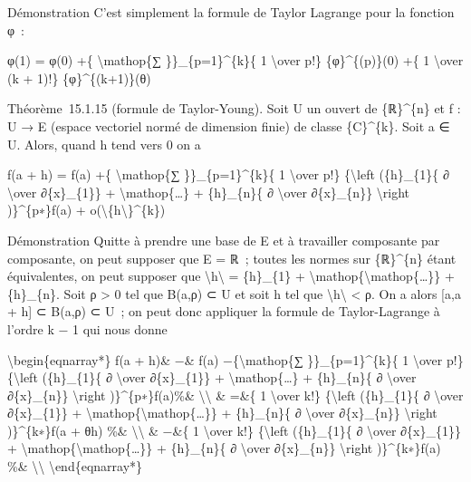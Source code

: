 Démonstration C'est simplement la formule de Taylor Lagrange pour la
fonction φ~:

φ(1) = φ(0) +\{ \textbackslash{}mathop\{∑ \}\}\_\{p=1\}\^{}\{k\}\{ 1
\textbackslash{}over p!\} \{φ\}\^{}\{(p)\}(0) +\{ 1 \textbackslash{}over
(k + 1)!\} \{φ\}\^{}\{(k+1)\}(θ)

Théorème~15.1.15 (formule de Taylor-Young). Soit U un ouvert de
\{ℝ\}\^{}\{n\} et f : U → E (espace vectoriel normé de dimension finie)
de classe \{C\}\^{}\{k\}. Soit a ∈ U. Alors, quand h tend vers 0 on a

f(a + h) = f(a) +\{ \textbackslash{}mathop\{∑ \}\}\_\{p=1\}\^{}\{k\}\{ 1
\textbackslash{}over p!\} \{\textbackslash{}left (\{h\}\_\{1\}\{ ∂
\textbackslash{}over ∂\{x\}\_\{1\}\} +
\textbackslash{}mathop\{\ldots{}\} + \{h\}\_\{n\}\{ ∂
\textbackslash{}over ∂\{x\}\_\{n\}\} \textbackslash{}right
)\}\^{}\{p∗\}f(a) +
o(\textbackslash{}\textbar{}\{h\textbackslash{}\textbar{}\}\^{}\{k\})

Démonstration Quitte à prendre une base de E et à travailler composante
par composante, on peut supposer que E = ℝ~; toutes les normes sur
\{ℝ\}\^{}\{n\} étant équivalentes, on peut supposer que
\textbackslash{}\textbar{}h\textbackslash{}\textbar{} =
\textbar{}\{h\}\_\{1\}\textbar{} +
\textbackslash{}mathop\{\textbackslash{}mathop\{\ldots{}\}\} +
\textbar{}\{h\}\_\{n\}\textbar{}. Soit ρ \textgreater{} 0 tel que B(a,ρ)
⊂ U et soit h tel que
\textbackslash{}\textbar{}h\textbackslash{}\textbar{} \textless{} ρ. On
a alors {[}a,a + h{]} ⊂ B(a,ρ) ⊂ U~; on peut donc appliquer la formule
de Taylor-Lagrange à l'ordre k − 1 qui nous donne

\textbackslash{}begin\{eqnarray*\} f(a + h)\& −\& f(a)
−\{\textbackslash{}mathop\{∑ \}\}\_\{p=1\}\^{}\{k\}\{ 1
\textbackslash{}over p!\} \{\textbackslash{}left (\{h\}\_\{1\}\{ ∂
\textbackslash{}over ∂\{x\}\_\{1\}\} +
\textbackslash{}mathop\{\ldots{}\} + \{h\}\_\{n\}\{ ∂
\textbackslash{}over ∂\{x\}\_\{n\}\} \textbackslash{}right
)\}\^{}\{p∗\}f(a)\%\& \textbackslash{}\textbackslash{} \& =\&\{ 1
\textbackslash{}over k!\} \{\textbackslash{}left (\{h\}\_\{1\}\{ ∂
\textbackslash{}over ∂\{x\}\_\{1\}\} +
\textbackslash{}mathop\{\textbackslash{}mathop\{\ldots{}\}\} +
\{h\}\_\{n\}\{ ∂ \textbackslash{}over ∂\{x\}\_\{n\}\}
\textbackslash{}right )\}\^{}\{k∗\}f(a + θh) \%\&
\textbackslash{}\textbackslash{} \& −\&\{ 1 \textbackslash{}over k!\}
\{\textbackslash{}left (\{h\}\_\{1\}\{ ∂ \textbackslash{}over
∂\{x\}\_\{1\}\} +
\textbackslash{}mathop\{\textbackslash{}mathop\{\ldots{}\}\} +
\{h\}\_\{n\}\{ ∂ \textbackslash{}over ∂\{x\}\_\{n\}\}
\textbackslash{}right )\}\^{}\{k∗\}f(a) \%\&
\textbackslash{}\textbackslash{} \textbackslash{}end\{eqnarray*\}

